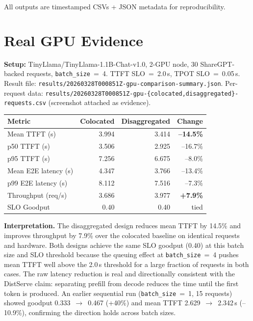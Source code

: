 \documentclass[11pt,letterpaper]{article}
\begin{document}
All outputs are timestamped CSVs + JSON metadata for reproducibility.

\section{Real GPU Evidence}

\textbf{Setup:} TinyLlama/TinyLlama-1.1B-Chat-v1.0, 2-GPU node,
30 ShareGPT-backed requests, \texttt{batch\_size}~=~4.
TTFT SLO~=~2.0\,s, TPOT SLO~=~0.05\,s.
Result file: \texttt{results/20260328T000851Z-gpu-comparison-summary.json}.
Per-request data: \texttt{results/20260328T000851Z-gpu-\{colocated,disaggregated\}-requests.csv}
(screenshot attached as evidence).

\begin{center}
\begin{tabular}{lrrr}
\toprule
\textbf{Metric} & \textbf{Colocated} & \textbf{Disaggregated} & \textbf{Change} \\
\midrule
Mean TTFT (s)        & 3.994 & 3.414 & \textbf{--14.5\%} \\
p50 TTFT (s)         & 3.506 & 2.925 & --16.7\% \\
p95 TTFT (s)         & 7.256 & 6.675 & --8.0\% \\
Mean E2E latency (s) & 4.347 & 3.766 & --13.4\% \\
p99 E2E latency (s)  & 8.112 & 7.516 & --7.3\% \\
Throughput (req/s)   & 3.686 & 3.977 & \textbf{+7.9\%} \\
SLO Goodput          & 0.40  & 0.40  & tied \\
\bottomrule
\end{tabular}
\end{center}

\textbf{Interpretation.}
The disaggregated design reduces mean TTFT by 14.5\% and improves throughput by
7.9\% over the colocated baseline on identical requests and hardware. Both designs
achieve the same SLO goodput (0.40) at this batch size and SLO threshold because
the queuing effect at \texttt{batch\_size}~=~4 pushes mean TTFT well above the
2.0\,s threshold for a large fraction of requests in both cases.
The raw latency reduction is real and directionally consistent with the DistServe
claim: separating prefill from decode reduces the time until the first token is
produced. An earlier sequential run (\texttt{batch\_size}~=~1, 15 requests)
showed goodput 0.333~$\to$~0.467 (+40\%) and mean TTFT
2.629~$\to$~2.342\,s (--10.9\%), confirming the direction holds across batch sizes.
\end{document}
